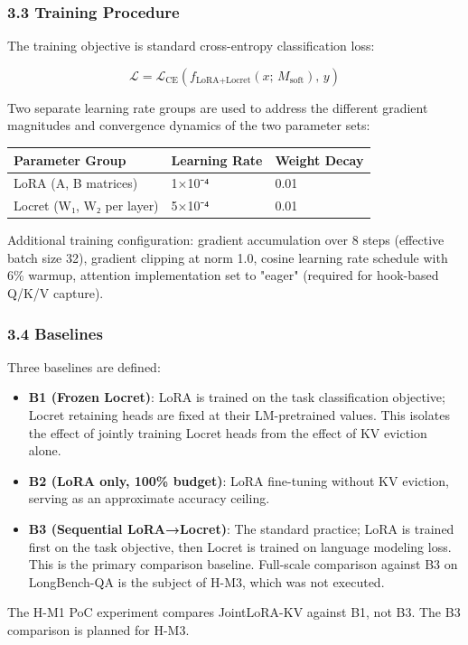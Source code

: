 \subsubsection{3.3 Training Procedure}

The training objective is standard cross-entropy classification loss:

$$\mathcal{L} = \mathcal{L}_{\text{CE}}(f_{\text{LoRA+Locret}}(x;\, M_{\text{soft}}),\, y)$$

Two separate learning rate groups are used to address the different gradient magnitudes and convergence dynamics of the two parameter sets:

\begin{table}[htbp]
\centering
\begin{tabular}{lll}
\toprule
Parameter Group & Learning Rate & Weight Decay \\
\midrule
LoRA (A, B matrices) & 1×10⁻⁴ & 0.01 \\
Locret (W₁, W₂ per layer) & 5×10⁻⁴ & 0.01 \\
\bottomrule
\end{tabular}
\end{table}

Additional training configuration: gradient accumulation over 8 steps (effective batch size 32), gradient clipping at norm 1.0, cosine learning rate schedule with 6\% warmup, attention implementation set to "eager" (required for hook-based Q/K/V capture).

\subsubsection{3.4 Baselines}

Three baselines are defined:

\begin{itemize}
\item \textbf{B1 (Frozen Locret)}: LoRA is trained on the task classification objective; Locret retaining heads are fixed at their LM-pretrained values. This isolates the effect of jointly training Locret heads from the effect of KV eviction alone.
\item \textbf{B2 (LoRA only, 100\% budget)}: LoRA fine-tuning without KV eviction, serving as an approximate accuracy ceiling.
\item \textbf{B3 (Sequential LoRA→Locret)}: The standard practice; LoRA is trained first on the task objective, then Locret is trained on language modeling loss. This is the primary comparison baseline. Full-scale comparison against B3 on LongBench-QA is the subject of H-M3, which was not executed.
\end{itemize}

The H-M1 PoC experiment compares JointLoRA-KV against B1, not B3. The B3 comparison is planned for H-M3.

